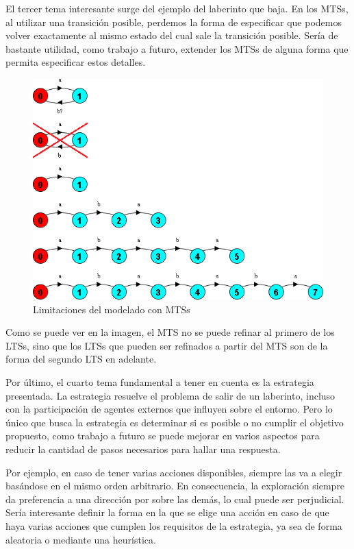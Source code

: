 \vspace{\baselineskip}
El tercer tema interesante surge del ejemplo del laberinto que baja. En los MTSs, al utilizar una transición posible, perdemos la forma 
de especificar que podemos volver exactamente al mismo estado del cual sale la transición posible. Sería de bastante utilidad, como 
trabajo a futuro, extender los MTSs de alguna forma que permita especificar estos detalles.

\begin{figure}[H]
	\centering
		\includegraphics[width=1.0\textwidth]{Imagenes/Otros/Limitaciones.png}
	\caption{Limitaciones del modelado con MTSs}
	\label{fig:Limitaciones}
\end{figure}

Como se puede ver en la imagen, el MTS no se puede refinar al primero de los LTSs, sino que los LTSs que pueden ser refinados a partir 
del MTS son de la forma del segundo LTS en adelante.

\vspace{\baselineskip}
Por último, el cuarto tema fundamental a tener en cuenta es la estrategia presentada. La estrategia resuelve el problema de salir de 
un laberinto, incluso con la participación de agentes externos que influyen sobre el entorno. Pero lo único que busca la estrategia 
es determinar si es posible o no cumplir el objetivo propuesto, como trabajo a futuro se puede mejorar en varios aspectos para reducir 
la cantidad de pasos necesarios para hallar una respuesta.

\vspace{\baselineskip}
Por ejemplo, en caso de tener varias acciones disponibles, siempre las va a elegir basándose en el mismo orden arbitrario. En consecuencia, 
la exploración siempre da preferencia a una dirección por sobre las demás, lo cual puede ser perjudicial. Sería interesante definir 
la forma en la que se elige una acción en caso de que haya varias acciones que cumplen los requisitos de la estrategia, ya sea de forma 
aleatoria o mediante una heurística.

